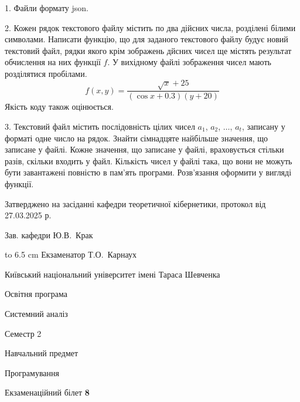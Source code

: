 \documentclass[12pt, ukrainian]{article}
\begin{document}
{%
1. Файли формату json.%
\par
\vspace{2mm}

2. Кожен рядок текстового файлу містить по два дійсних числа, розділені білими символами.
Написати функцію, що для заданого текстового файлу будує новий текстовий файл, рядки якого крім зображень дйсних чисел ще містять результат обчислення на них функції $f$. У вихідному файлі зображення чисел мають розділятися пробілами. 
$$f(x, y) =\frac{\sqrt x + 25}{(\cos x + 0.3) (y + 20)}$$ 
Якість коду також оцінюється.

\par
\vspace{2mm}

3. Текстовий файл містить послідовність цілих чисел $a_1$, $a_2$, $\ldots$, $a_t$, записану у форматі одне число на рядок. Знайти сімнадцяте найбільше значення, що записане у файлі. Кожне значення, що записане у файлі, враховується стільки разів, скільки входить у файл. Кількість чисел у файлі така, що вони не можуть бути завантажені повністю в пам'ять програми. Розв'язання оформити у вигляді функції.

}
{\smallskip\smallskip \begin {scriptsize} Затверджено на засіданні кафедри теоретичної кібернетики, протокол   від   27.03.2025 р.\par\smallskip\smallskip\smallskip\smallskip
{\parbox {6.5 cm} {Зав. кафедри \dotfill Ю.В.~Крак}}\hspace {0.7cm} {\hbox to 6.5 cm { Екзаменатор \dotfill Т.О.~Карнаух}} \end{scriptsize}}
\vspace{2.9cm}
{{\begin {scriptsize}\par
{ \center  Київський національний університет імені Тараса Шевченка \par}
{\parbox {5 cm}{Освітня програма \hfill}{\parbox {7 cm}{Системний аналіз\hfill}}\parbox {6 cm}{\hfill Семестр 2}}\par
{\parbox {5 cm} {Навчальний предмет \hfill}\parbox {7 cm}{Програмування \hfill}\parbox {6cm}{\hfill}\par}\vspace{-15pt} \end{scriptsize}}{\center Екзаменаційний білет \No \textbf { 8 }\par}}
\end{document}
